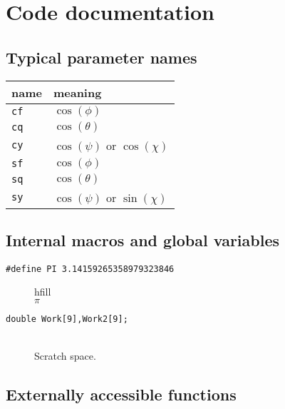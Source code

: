 \documentclass[11pt]{article}
\newcommand {\ttt} {\texttt}
\begin{document}
\section{Code documentation}

\subsection{Typical parameter names}
\begin{longtable}[c]{ll}
name & meaning \\
\hline
\ttt{cf} & $\cos(\phi)$ \\
\ttt{cq} & $\cos(\theta)$ \\
\ttt{cy} & $\cos(\psi)$ or $\cos(\chi)$ \\
\ttt{sf} & $\cos(\phi)$ \\
\ttt{sq} & $\cos(\theta)$ \\
\ttt{sy} & $\cos(\psi)$ or $\sin(\chi)$
\end{longtable}

\subsection{Internal macros and global variables}

\begin{description}

\item[\ttt{\#define PI 3.14159265358979323846}]
hfill \\
$\pi$

\item[\ttt{double Work[9],Work2[9];}]
\hfill \\
Scratch space.

\end{description}

\subsection{Externally accessible functions}
\end{document}
